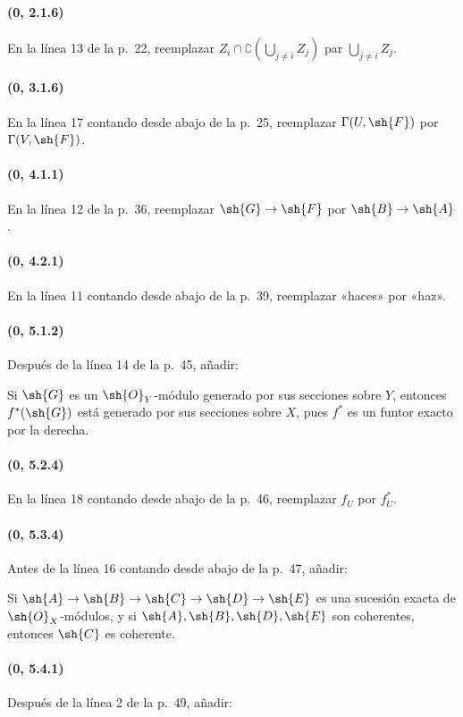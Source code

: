 \documentclass[oneside,10pt]{amsart}
\makeatletter
\newcommand{\ega@arrow}[2]{\mathchoice{#1}{#2}{#2}{#2}}
\renewcommand{\to}{\ega@arrow{\longrightarrow}{\rightarrow}}
\makeatother
\begin{document}
\paragraph{(0, 2.1.6)}
En la línea 13 de la p.~22, reemplazar
$Z_i\cap\complement(\bigcup\limits_{j\ne i}Z_j)$ par
$\bigcup\limits_{j\ne i}Z_j$.

\paragraph{(0, 3.1.6)}
En la línea 17 contando desde abajo de la p.~25, reemplazar
$\Gamma(U,\sh{F})$ por $\Gamma(V,\sh{F})$.

\paragraph{(0, 4.1.1)}
En la línea 12 de la p.~36, reemplazar $\sh{G}\to\sh{F}$ por
$\sh{B}\to\sh{A}$.

\paragraph{(0, 4.2.1)}
En la línea 11 contando desde abajo de la p.~39, reemplazar «haces» por
«haz».

\paragraph{(0, 5.1.2)}
Después de la línea 14 de la p.~45, añadir:

Si $\sh{G}$ es un $\sh{O}_Y$-módulo generado por sus secciones sobre
$Y$, entonces $f^*(\sh{G})$ está generado por sus secciones sobre $X$,
pues $f^*$ es un funtor exacto por la derecha.

\paragraph{(0, 5.2.4)}
En la línea 18 contando desde abajo de la p.~46, reemplazar $f_U$ por
$f_U^*$.

\paragraph{(0, 5.3.4)}
Antes de la línea 16 contando desde abajo de la p.~47, añadir:

Si
$\sh{A}\to\sh{B}\to\sh{C}\to\sh{D}\to\sh{E}$
es una sucesión exacta de $\sh{O}_X$-módulos, y si
$\sh{A},\sh{B},\sh{D},\sh{E}$ son coherentes, entonces $\sh{C}$ es
coherente.

\paragraph{(0, 5.4.1)}
Después de la línea 2 de la p.~49, añadir:
\end{document}
